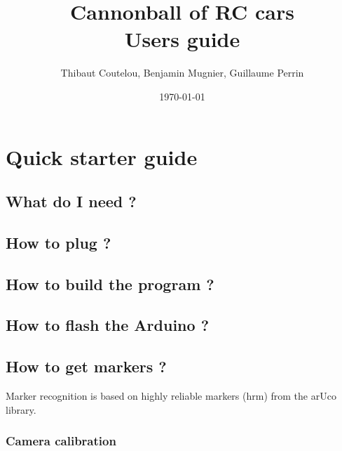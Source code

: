 \documentclass[a4paper,11pt]{report}
\title{Cannonball of RC cars\\Users guide}
\author{Thibaut Coutelou, Benjamin Mugnier, Guillaume Perrin}
\date{\today}
\begin{document}
\maketitle
\tableofcontents

\setlength{\parskip}{3mm}










\chapter{Quick starter guide}

\section{What do I need ?}

\section{How to plug ?}

\section{How to build the program ?}

\section{How to flash the Arduino ?}

\section{How to get markers ?}

Marker recognition is based on highly reliable markers (hrm) from the arUco
library.

\subsection{Camera calibration}
\end{document}
